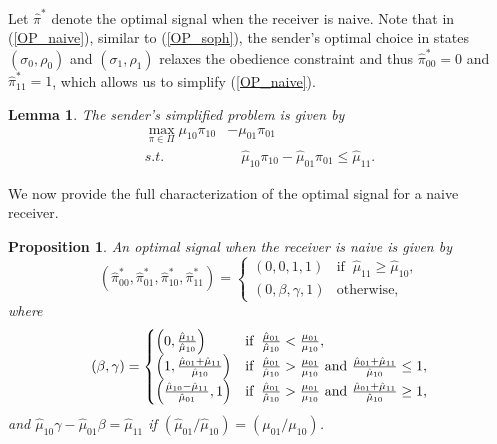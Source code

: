 \documentclass[12pt,english]{article}
\newtheorem{proposition}{Proposition}
\newtheorem{lemma}{Lemma}
\theoremstyle{plain}
\begin{document}
Let $\hat\pi^*$ denote the optimal signal when the receiver is naive. 
Note that in (\ref{OP_naive}), similar to (\ref{OP_soph}), the sender's optimal choice in states $(\sigma_0, \rho_0)$ and $(\sigma_1, \rho_1)$ relaxes the obedience constraint and thus $\hat{\pi}^*_{00}=0$ and $\hat{\pi}^*_{11}=1$, which allows us to simplify (\ref{OP_naive}).

\begin{lemma}\label{lemma:naive_R_simpl_OP}
The sender's simplified problem is given by
\begin{equation}
    \begin{aligned}
\max_{\pi\in\Pi} \mu_{10}\pi_{10} & - \mu_{01}\pi_{01}\\
s.t. & \quad\hat{\mu}_{10}\pi_{10}-\hat{\mu}_{01}\pi_{01}\leq\hat{\mu}_{11}.
\label{OP_BR_simplified}
\end{aligned}
\end{equation}
\end{lemma}

We now provide the full characterization of the optimal signal for a naive receiver.

\begin{proposition}\label{pr:signal_corr_neglect} 
An optimal signal when the receiver is naive is given by
\begin{equation*}
(\hat\pi^*_{00},\hat\pi^*_{01},\hat\pi^*_{10},\hat\pi^*_{11})=\begin{cases}
(0,0,1,1) & \text{if }\:\hat\mu_{11}\geq\hat\mu_{10},\\
(0,\beta,\gamma,1) & \text{otherwise},
\end{cases}
\end{equation*}
where
\begin{equation*}
\left(\beta,\gamma\right)=\begin{cases}
\left(0,\frac{\hat{\mu}_{11}}{\hat{\mu}_{10}}\right) & \text{if }\:\frac{\hat{\mu}_{01}}{\hat{\mu}_{10}}<\frac{\mu_{01}}{\mu_{10}},\\
\left(1,\frac{\hat{\mu}_{01}+\hat{\mu}_{11}}{\hat{\mu}_{10}}\right) & \text{if }\:\frac{\hat{\mu}_{01}}{\hat{\mu}_{10}}>\frac{\mu_{01}}{\mu_{10}}\text{ and }\frac{\hat{\mu}_{01}+\hat{\mu}_{11}}{\hat{\mu}_{10}}\leq1,\\
\left(\frac{\hat{\mu}_{10}-\hat{\mu}_{11}}{\hat{\mu}_{01}},1\right) & \text{if }\:\frac{\hat{\mu}_{01}}{\hat{\mu}_{10}}>\frac{\mu_{01}}{\mu_{10}}\text{ and }\frac{\hat{\mu}_{01}+\hat{\mu}_{11}}{\hat{\mu}_{10}}\geq1,
\end{cases}
\vspace{0.25cm}
\end{equation*}
and $\hat{\mu}_{10}\gamma-\hat{\mu}_{01}\beta=\hat{\mu}_{11}$ if $(\hat\mu_{01}/\hat\mu_{10})=(\mu_{01}/\mu_{10})$.
\end{proposition}
\end{document}

